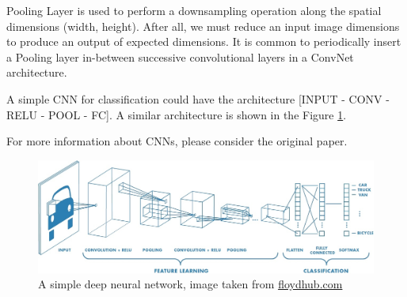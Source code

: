 Pooling Layer is used to perform a downsampling operation along the spatial dimensions (width, height). After all, we must reduce an input image dimensions to produce an output of expected dimensions.  It is common to periodically insert a Pooling layer in-between successive convolutional layers in a ConvNet architecture.

A simple CNN for classification could have the architecture [INPUT - CONV - RELU - POOL - FC]. A similar architecture is shown in the Figure \ref{fig:cnn}.

 For more information about CNNs, please consider the original paper\cite{krizhevsky2012imagenet}. 
 
 \begin{figure}[h]
\includegraphics[width=13cm]{cnn}
\caption{A simple deep neural network, image taken from \url{floydhub.com}}
\label{fig:cnn}

\end{figure}
